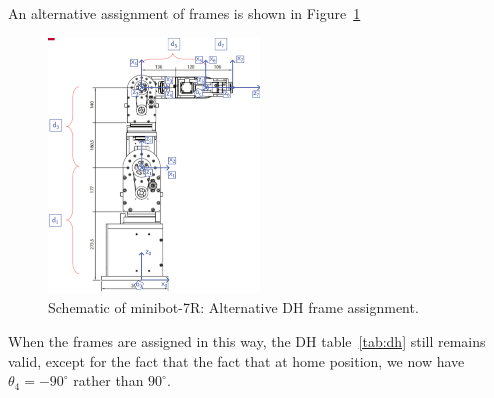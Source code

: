 An alternative assignment of frames is shown in Figure~\ref{fig:minibot_alt}
%
\begin{figure}[h]
  \centering
  \includegraphics[width=0.5\textwidth]{./figures/minibot-7R_alternative.eps}
  \caption{Schematic of minibot-7R: Alternative DH frame assignment.}
  \label{fig:minibot_alt}
\end{figure}
%
When the frames are assigned in this way, the DH table~\ref{tab:dh} still
remains valid, except for the fact that the fact that at home position, we now
have $\theta_4 = -90^\circ$ rather than $90^\circ$.
